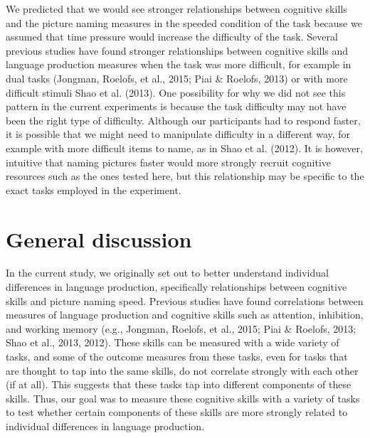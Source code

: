 \documentclass[
  man,floatsintext]{apa6}
\begin{document}
We predicted that we would see stronger relationships between cognitive skills and the picture naming measures in the speeded condition of the task because we assumed that time pressure would increase the difficulty of the task. Several previous studies have found stronger relationships between cognitive skills and language production measures when the task was more difficult, for example in dual tasks (Jongman, Roelofs, et al., 2015; Piai \& Roelofs, 2013) or with more difficult stimuli Shao et al. (2013). One possibility for why we did not see this pattern in the current experiments is because the task difficulty may not have been the right type of difficulty. Although our participants had to respond faster, it is possible that we might need to manipulate difficulty in a different way, for example with more difficult items to name, as in Shao et al. (2012). It is however, intuitive that naming pictures faster would more strongly recruit cognitive resources such as the ones tested here, but this relationship may be specific to the exact tasks employed in the experiment.

\hypertarget{general-discussion}{%
\section{General discussion}\label{general-discussion}}

In the current study, we originally set out to better understand individual differences in language production, specifically relationships between cognitive skills and picture naming speed. Previous studies have found correlations between measures of language production and cognitive skills such as attention, inhibition, and working memory (e.g., Jongman, Roelofs, et al., 2015; Piai \& Roelofs, 2013; Shao et al., 2013, 2012). These skills can be measured with a wide variety of tasks, and some of the outcome measures from these tasks, even for tasks that are thought to tap into the same skills, do not correlate strongly with each other (if at all). This suggests that these tasks tap into different components of these skills. Thus, our goal was to measure these cognitive skills with a variety of tasks to test whether certain components of these skills are more strongly related to individual differences in language production.
\end{document}
